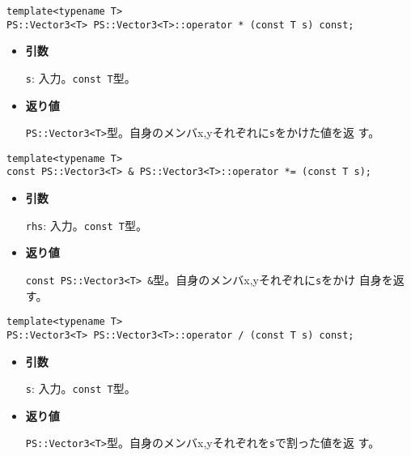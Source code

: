 \mbox{}

\begin{screen}
\begin{verbatim}
template<typename T>
PS::Vector3<T> PS::Vector3<T>::operator * (const T s) const;
\end{verbatim}
\end{screen}

\begin{itemize}

\item{{\bf 引数}}

{\tt s}: 入力。{\tt const T}型。

\item{{\bf 返り値}}

{\tt PS::Vector3<T>}型。自身のメンバx,yそれぞれに{\tt s}をかけた値を返
す。

\end{itemize}


\begin{screen}
\begin{verbatim}
template<typename T>
const PS::Vector3<T> & PS::Vector3<T>::operator *= (const T s);
\end{verbatim}
\end{screen}

\begin{itemize}

\item{{\bf 引数}}

{\tt rhs}: 入力。{\tt const T}型。

\item{{\bf 返り値}}

{\tt const PS::Vector3<T> \&}型。自身のメンバx,yそれぞれに{\tt s}をかけ
自身を返す。

\end{itemize}


\begin{screen}
\begin{verbatim}
template<typename T>
PS::Vector3<T> PS::Vector3<T>::operator / (const T s) const;
\end{verbatim}
\end{screen}

\begin{itemize}

\item{{\bf 引数}}

{\tt s}: 入力。{\tt const T}型。

\item{{\bf 返り値}}

{\tt PS::Vector3<T>}型。自身のメンバx,yそれぞれを{\tt s}で割った値を返
す。

\end{itemize}


